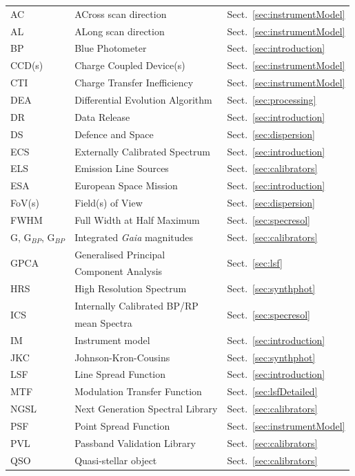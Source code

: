 \documentclass{aa}
\newcommand{\gaia}{\textit{Gaia}\xspace}
\newcommand{\secname}{Sect.}
\newcommand{\secref}[1]{\secname~\ref{sec:#1}}
\begin{document}
\begin{appendix}
\begin{table}[hp]
\begin{tabular}{l|l|l}
AC & ACross scan direction & \secref{instrumentModel} \\
AL & ALong scan direction & \secref{instrumentModel} \\
BP & Blue Photometer & \secref{introduction} \\
CCD(s) & Charge Coupled Device(s) & \secref{instrumentModel} \\
CTI & Charge Transfer Inefficiency & \secref{instrumentModel} \\
DEA & Differential Evolution Algorithm & \secref{processing} \\
DR & Data Release  & \secref{introduction} \\
DS &  Defence and Space  & \secref{dispersion} \\
ECS & Externally Calibrated Spectrum & \secref{introduction} \\
ELS & Emission Line Sources  & \secref{calibrators} \\
ESA & European Space Mission & \secref{introduction} \\
FoV(s) &  Field(s) of View & \secref{dispersion} \\
FWHM & Full Width at Half Maximum & \secref{specresol} \\
G, G$_{BP}$, G$_{BP}$ & Integrated \gaia magnitudes &\secref{calibrators} \\
\multirow{2}{*}{GPCA} & Generalised Principal  & \multirow{2}{*}{\secref{lsf}} \\
 & Component Analysis &  \\
HRS & High Resolution Spectrum & \secref{synthphot} \\
\multirow{2}{*}{ICS} & Internally Calibrated BP/RP   & \multirow{2}{*}{\secref{specresol}} \\
 & mean Spectra &\\
IM & Instrument model & \secref{introduction} \\
JKC & Johnson-Kron-Cousins  & \secref{synthphot} \\
LSF &  Line Spread Function  & \secref{introduction} \\
MTF & Modulation Transfer Function & \secref{lsfDetailed} \\
NGSL &  Next Generation Spectral Library  & \secref{calibrators} \\
PSF & Point Spread Function & \secref{instrumentModel} \\
PVL & Passband Validation Library   & \secref{calibrators} \\
QSO & Quasi-stellar object &  \secref{calibrators} \\

\end{tabular}
\end{table}
\end{appendix}
\end{document}
